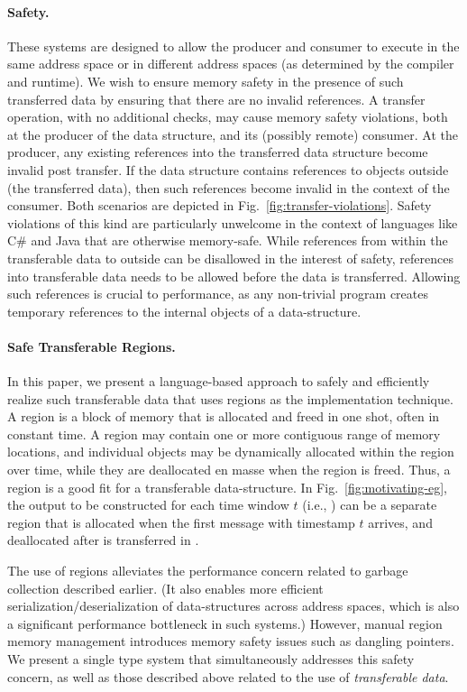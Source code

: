 \paragraph{Safety.}
These systems are designed to allow the producer and consumer to
execute in the same address space or in different address spaces
(as determined by the compiler and runtime).
We wish to ensure memory safety in the presence of such transferred data by ensuring
that there are no invalid references. A transfer operation, with no
additional checks, may cause memory safety violations, both at the
producer of the data structure, and its (possibly remote) consumer. At
the producer, any existing references into the transferred data structure become
invalid post transfer. If the data structure contains references to
objects outside (the transferred data), then such references become
invalid in the context of the consumer. Both scenarios are depicted in
Fig.~\ref{fig:transfer-violations}. Safety violations of this kind are
particularly unwelcome in the context of languages like C\# and Java
that are otherwise memory-safe. While references from within the
transferable data to outside can be disallowed in the interest of safety,
references into transferable data needs to be allowed before the data
is transferred. Allowing such references is crucial to performance,
as any non-trivial program creates temporary references to the internal
objects of a data-structure.

\paragraph{Safe Transferable Regions.}
In this paper, we present a language-based approach to safely and
efficiently realize such transferable data that uses regions as
the implementation technique.
%
A region is a block of memory that is allocated
and freed in one shot, often in constant time. A region may contain
one or more contiguous range of memory locations, and individual
objects may be dynamically allocated within the region over time,
while they are deallocated en masse when the region is freed.  Thus, a
region is a good fit for a transferable data-structure.  In
Fig.~\ref{fig:motivating-eg}, the output to be constructed for each
time window $t$ (i.e., ) can be a separate region that is
allocated when the first message with timestamp $t$ arrives, and
deallocated after  is transferred in .

The use of regions alleviates the performance concern related to
garbage collection described earlier. (It also enables more efficient
serialization/deserialization of data-structures across address spaces,
which is also a significant performance bottleneck in such systems.)
However, manual region memory management introduces memory safety
issues such as dangling pointers.
We present a single type system that simultaneously addresses
this safety concern, as well as those described above related to
the use of \emph{transferable data}.

